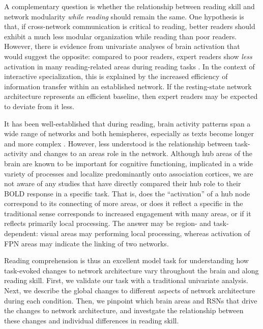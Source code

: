 A complementary question is whether the relationship between reading skill and network modularity \textit{while reading} should remain the same. One hypothesis is that, if cross-network communication is critical to reading, better readers should exhibit a much less modular organization while reading than poor readers. However, there is evidence from univariate analyses of brain activation that would suggest the opposite: compared to poor readers, expert readers show \textit{less} activation in many reading-related areas during reading tasks \citep{Christodoulou2014}. In the context of interactive specialization, this is explained by the increased efficiency of information transfer within an established network. If the resting-state network architecture represents an efficient baseline, then expert readers may be expected to deviate from it less.

It has been well-established that during reading, brain activity patterns span a wide range of networks and both hemispheres, especially as texts become longer and more complex \citep{Rimrodt2009, Xu2005}. However, less understood is the relationship between task-activity and changes to an areas role in the network. Although hub areas of the brain are known to be important for cognitive functioning, implicated in a wide variety of processes and localize predominantly onto association cortices, we are not aware of any studies that have directly compared their hub role to their BOLD response in a specific task. That is, does the ``activation'' of a hub node correspond to its connecting of more areas, or does it reflect a specific in the traditional sense corresponds to increased engagement with many areas, or if it reflects primarily local processing. The answer may be region- and task-dependent: visual areas may performing local processing, whereas activation of FPN areas may indicate the linking of two networks. 

Reading comprehension is thus an excellent model task for understanding how task-evoked changes to network architecture vary throughout the brain and along reading skill. First, we validate our task with a traditional univariate analysis. Next, we describe the global changes to different aspects of network architecture during each condition. Then, we pinpoint which brain areas and RSNs that drive the changes to network architecture, and investgate the relationship between these changes and individual differences in reading skill. 


